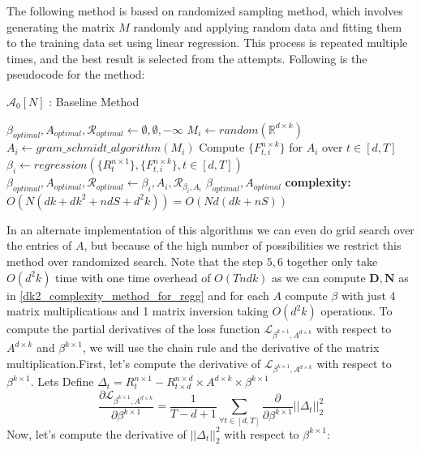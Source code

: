  The following method is based on randomized sampling method, which involves generating the matrix $M$ randomly and applying random data and fitting them to the training data set using linear regression. This process is repeated multiple times, and the best result is selected from the attempts.
Following is the pseudocode for the method:
\begin{algorithm}[H]
\caption{$\mathcal{A}_{0}[N]$ : Baseline Method}\label{lfm_baseline_method}
\begin{algorithmic}[1]
\State $\beta_{optimal}, A_{optimal}, \mathcal{R}_{optimal} \gets \emptyset, \emptyset, -\infty $
    \State $M_i \gets random(\mathbb{R}^{d\times k})$
    \State $A_i \gets gram\_schmidt\_algorithm(M_i)$
    \State Compute $\{F^{n\times k}_{t, i}\}$ for $A_i$ over $t\in [d,T]$
    \State $\beta_i \gets regression(\{R^{n\times 1}_{t}\},\{F^{n\times k}_{t, i}\}, t\in [d,T])$
      
        \State $\beta_{optimal}, A_{optimal}, \mathcal{R}_{optimal} \gets \beta_{i}, A_{i}, \mathcal{R}_{\beta_i, A_i} $
    \EndIf 
\EndFor
\State \Return  $\beta_{optimal}, A_{optimal}$
\State \textbf{complexity: } $O(N(dk+dk^2+ndS+d^2k)) = 
 O(Nd(dk+nS))$
\end{algorithmic}
\end{algorithm} In an alternate implementation of this algorithms we can even do grid search over the entries of $A$, but because of the high number of possibilities we restrict this method over randomized search. Note that the step $5,6$ together only take $O(d^2k)$ time with one time overhead of $O(Tndk)$ as we can compute $\mathbf{D}, \mathbf{N}$ as in \ref{dk2_complexity_method_for_regg} and for each $A$ compute $\beta$ with just 4 matrix multiplications and 1 matrix inversion taking $O(d^2k)$ operations.
To compute the partial derivatives of the loss function $\mathcal{L}_{\beta^{k \times 1}, A^{d\times k}}$ with respect to $A^{d\times k}$ and $\beta^{k \times 1}$, we will use the chain rule and the derivative of the matrix multiplication.\newline \newline First, let's compute the derivative of $\mathcal{L}_{\beta^{k \times 1}, A^{d\times k}}$ with respect to $\beta^{k \times 1}$. Lets Define $\Delta_t = R^{n\times 1}_t-R^{n\times d}_{t\times d}\times A^{d\times k} \times \beta^{k \times 1}$
\begin{equation}
    \frac{\partial \mathcal{L}_{\beta^{k \times 1}, A^{d\times k}}}{\partial \beta^{k \times 1}} = \frac{1}{T-d+1} \sum_{\forall t\in [d,T]} \frac{\partial}{\partial \beta^{k \times 1}} ||\Delta_t||_2^2 
\end{equation}
\newline Now, let's compute the derivative of $||\Delta_t||_2^2$ with respect to $\beta^{k\times 1}$:

